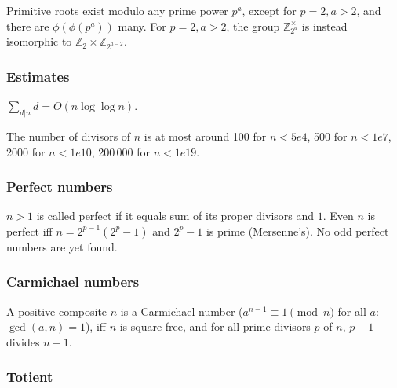   Primitive roots exist modulo any prime power $p^a$, except for $p = 2, a > 2$, and there are $\phi(\phi(p^a))$ many.
  For $p = 2, a > 2$, the group $\mathbb Z_{2^a}^\times$ is instead isomorphic to $\mathbb Z_2 \times \mathbb Z_{2^{a-2}}$.

\subsubsection{Estimates}
  $\sum_{d|n} d = O(n \log \log n)$.

  The number of divisors of $n$ is at most around 100 for $n < 5e4$, 500 for $n < 1e7$, 2000 for $n < 1e10$, 200\,000 for $n < 1e19$.

\subsubsection{Perfect numbers}  $n>1$ is called perfect if it equals
sum of its proper divisors and $1$.  Even $n$ is perfect iff $n = 2^{p-1} (2^p - 1)$
and $2^p - 1$ is prime (Mersenne's). No odd perfect numbers are yet found.

\subsubsection{Carmichael numbers}
A positive composite $n$ is a Carmichael number
($a^{n-1} \equiv 1 \pmod{n}$ for all $a$: $\gcd(a,n)=1$),
iff $n$ is square-free, and for all prime divisors $p$ of $n$, $p-1$ divides $n-1$.

\subsubsection{Totient}

